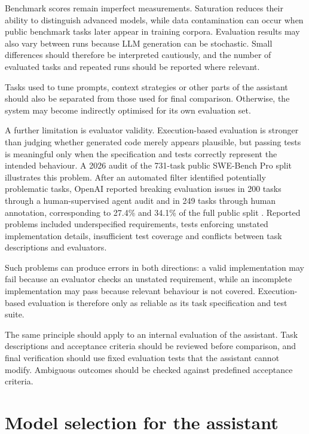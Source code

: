 Benchmark scores remain imperfect measurements. Saturation reduces their ability to distinguish advanced models, while data contamination can occur when public benchmark tasks later appear in training corpora. Evaluation results may also vary between runs because LLM generation can be stochastic. Small differences should therefore be interpreted cautiously, and the number of evaluated tasks and repeated runs should be reported where relevant.

Tasks used to tune prompts, context strategies or other parts of the assistant should also be separated from those used for final comparison. Otherwise, the system may become indirectly optimised for its own evaluation set.

A further limitation is evaluator validity. Execution-based evaluation is stronger than judging whether generated code merely appears plausible, but passing tests is meaningful only when the specification and tests correctly represent the intended behaviour. A 2026 audit of the 731-task public SWE-Bench Pro split illustrates this problem. After an automated filter identified potentially problematic tasks, OpenAI reported breaking evaluation issues in 200 tasks through a human-supervised agent audit and in 249 tasks through human annotation, corresponding to 27.4\% and 34.1\% of the full public split \parencite{openai2026codingaudit}. Reported problems included underspecified requirements, tests enforcing unstated implementation details, insufficient test coverage and conflicts between task descriptions and evaluators.

Such problems can produce errors in both directions: a valid implementation may fail because an evaluator checks an unstated requirement, while an incomplete implementation may pass because relevant behaviour is not covered. Execution-based evaluation is therefore only as reliable as its task specification and test suite.

The same principle should apply to an internal evaluation of the assistant. Task descriptions and acceptance criteria should be reviewed before comparison, and final verification should use fixed evaluation tests that the assistant cannot modify. Ambiguous outcomes should be checked against predefined acceptance criteria.

\section{Model selection for the assistant}
\label{sec:assistant-model-selection}

